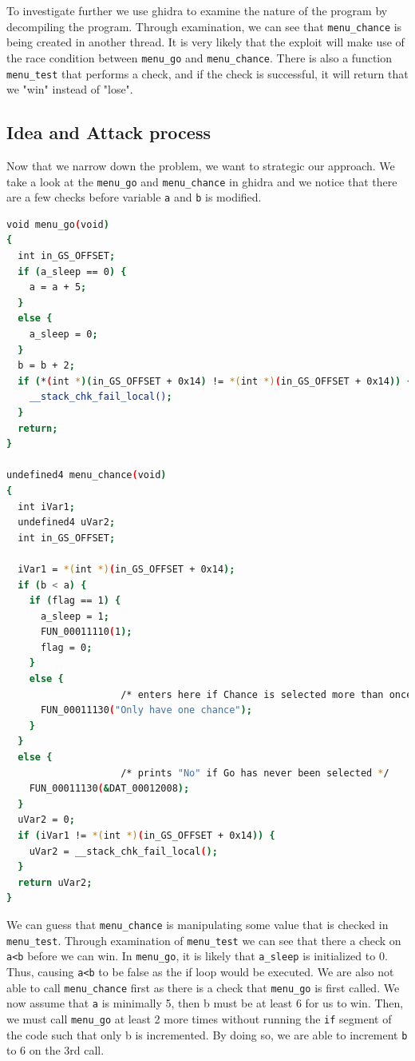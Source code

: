 \documentclass{article}
\newcommand{\code}[1]{\lstinline|#1|}
\begin{document}
To investigate further we use ghidra to examine the nature of the program by
decompiling the program. Through examination, we can see that
\code{menu_chance} is being created in another thread. It is very likely that
the exploit will make use of the race condition between \code{menu_go} and
\code{menu_chance}. There is also a function \code{menu_test} that performs a
check, and if the check is successful, it will return that we "win" instead of
"lose".

\subsection*{Idea and Attack process}

Now that we narrow down the problem, we want to strategic our approach. We take
a look at the \code{menu_go} and \code{menu_chance} in ghidra and we notice
that there are a few checks before variable \code{a} and \code{b} is modified.

\begin{lstlisting}[language=bash]
void menu_go(void)
{
  int in_GS_OFFSET;
  if (a_sleep == 0) {
    a = a + 5;
  }
  else {
    a_sleep = 0;
  }
  b = b + 2;
  if (*(int *)(in_GS_OFFSET + 0x14) != *(int *)(in_GS_OFFSET + 0x14)) {
    __stack_chk_fail_local();
  }
  return;
}

undefined4 menu_chance(void)
{
  int iVar1;
  undefined4 uVar2;
  int in_GS_OFFSET;
  
  iVar1 = *(int *)(in_GS_OFFSET + 0x14);
  if (b < a) {
    if (flag == 1) {
      a_sleep = 1;
      FUN_00011110(1);
      flag = 0;
    }
    else {
                    /* enters here if Chance is selected more than once */
      FUN_00011130("Only have one chance");
    }
  }
  else {
                    /* prints "No" if Go has never been selected */
    FUN_00011130(&DAT_00012008);
  }
  uVar2 = 0;
  if (iVar1 != *(int *)(in_GS_OFFSET + 0x14)) {
    uVar2 = __stack_chk_fail_local();
  }
  return uVar2;
}
\end{lstlisting}

We can guess that \code{menu_chance} is manipulating some value that is checked
in \code{menu_test}. Through examination of \code{menu_test} we can see that
there a check on \code{a<b} before we can win. In \code{menu_go}, it is likely
that \code{a_sleep} is initialized to 0. Thus, causing \code{a<b} to be false as the if
loop would be executed. We are also not able to call \code{menu_chance} first
as there is a check that \code{menu_go} is first called. We now assume that
\code{a} is minimally 5, then b must be at least 6 for us to win. Then, we must
call \code{menu_go} at least 2 more times without running the \code{if} segment
of the code such that only b is incremented. By doing so, we are able to
increment \code{b} to 6 on the 3rd call.
\end{document}
